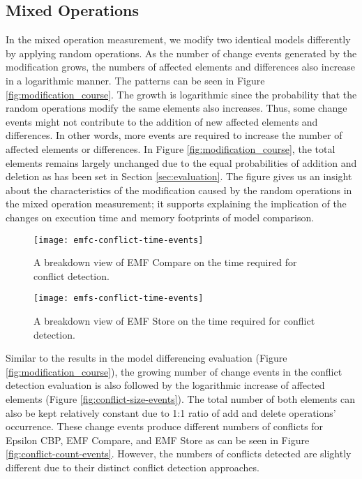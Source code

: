 \subsection{Mixed Operations}
\label{sec:mixed-operation_conflict}

In the mixed operation measurement, we modify two identical models differently by applying random operations. As the number of change events generated by the modification grows, the numbers of affected elements and differences also increase in a logarithmic manner. The patterns can be seen in Figure \ref{fig:modification_course}. The growth is logarithmic since the probability that the random operations modify the same elements also increases. Thus, some change events might not contribute to the addition of new affected elements and differences. In other words, more events are required to increase the number of affected elements or differences. In Figure \ref{fig:modification_course}, the total elements remains largely unchanged due to the equal probabilities of addition and deletion as has been set in Section \ref{sec:evaluation}. The figure gives us an insight about the characteristics of the modification caused by the random operations in the mixed operation measurement; it supports explaining the implication of the changes on execution time and memory footprints of model comparison.

\begin{figure}[ht]
  \centering
  \begin{minipage}[b]{0.495\textwidth}
    \texttt{[image: emfc-conflict-time-events]}
    \caption{A breakdown view of EMF Compare on the time required for conflict detection.}
    \label{fig:emfc-conflict-time-events}
  \end{minipage}
  \hfill
  \begin{minipage}[b]{0.495\textwidth}
    \texttt{[image: emfs-conflict-time-events]}
    \caption{A breakdown view of EMF Store on the time required for conflict detection.}
    \label{fig:emfs-conflict-time-events}
  \end{minipage}
\end{figure}

Similar to the results in the model differencing evaluation (Figure \ref{fig:modification_course}), the growing number of change events in the conflict detection evaluation is also followed by the logarithmic increase of affected elements (Figure \ref{fig:conflict-size-events}). The total number of both elements can also be kept relatively constant due to 1:1 ratio of \textsf{add} and \textsf{delete} operations' occurrence. These change events produce different numbers of conflicts for Epsilon CBP, EMF Compare, and EMF Store as can be seen in Figure \ref{fig:conflict-count-events}. However, the numbers of conflicts detected are slightly different due to their distinct conflict detection approaches. 

